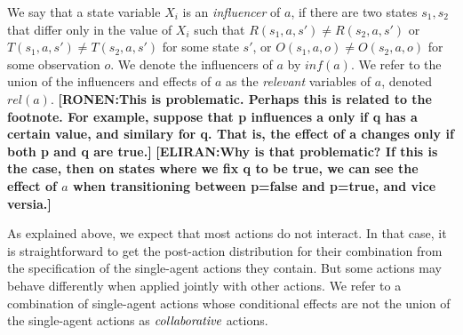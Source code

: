 \documentclass[letterpaper]{article} %
\newcommand{\eliran}[1]{\textbf{[\color{red}ELIRAN:#1]}}
\newcommand{\ronen}[1]{\textbf{[\color{blue}RONEN:#1]}}
\begin{document}
We say that a state variable $X_i$ is an
{\em influencer} of $a$, if there are two states $s_1,s_2$ that differ only in the value of $X_i$ such that $R(s_1,a,s')\neq R(s_2,a,s')$ or $T(s_1,a,s')\neq T(s_2,a,s')$ for some state $s'$, or $O(s_1,a,o)\neq O(s_2,a,o)$ for some observation $o$.
We denote the influencers of $a$ by
$inf(a)$.
We refer to the union of the influencers and effects of $a$ as
the {\em relevant} variables of $a$,
denoted $rel(a)$.
\ronen{This is problematic. Perhaps this is related to the footnote. For example, suppose that p influences a only if q has a certain value, and similary for q. That is, the effect of a changes only if both p and q are true.}
\eliran{Why is that problematic? If this is the case, then on states where we fix q to be true, we can see the effect of $a$ when transitioning between p=false and p=true, and vice versia.}


As explained above, we expect that most actions do not interact. In that case, it is straightforward to get the post-action distribution for their combination from the specification of the single-agent actions they contain. But some actions may behave differently when applied jointly with other actions. We refer to a combination of single-agent actions whose conditional effects are not the union of the single-agent actions as $\emph{collaborative}$ actions.
\end{document}
